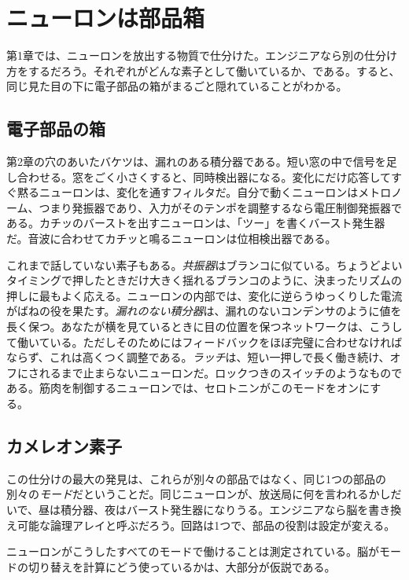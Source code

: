 \chapter{ニューロンは部品箱}

第1章では、ニューロンを放出する物質で仕分けた。エンジニアなら別の仕分け方をするだろう。それぞれがどんな素子として働いているか、である。すると、同じ見た目の下に電子部品の箱がまるごと隠れていることがわかる。

\section*{電子部品の箱}

第2章の穴のあいたバケツは、漏れのある積分器である。短い窓の中で信号を足し合わせる。窓をごく小さくすると、同時検出器になる。変化にだけ応答してすぐ黙るニューロンは、変化を通すフィルタだ。自分で動くニューロンはメトロノーム、つまり発振器であり、入力がそのテンポを調整するなら電圧制御発振器である。カチッのバーストを出すニューロンは、「ツー」を書くバースト発生器だ。音波に合わせてカチッと鳴るニューロンは位相検出器である。


これまで話していない素子もある。\emph{共振器}はブランコに似ている。ちょうどよいタイミングで押したときだけ大きく揺れるブランコのように、決まったリズムの押しに最もよく応える。ニューロンの内部では、変化に逆らうゆっくりした電流がばねの役を果たす。\emph{漏れのない積分器}は、漏れのないコンデンサのように値を長く保つ。あなたが横を見ているときに目の位置を保つネットワークは、こうして働いている。ただしそのためにはフィードバックをほぼ完璧に合わせなければならず、これは高くつく調整である。\emph{ラッチ}は、短い一押しで長く働き続け、オフにされるまで止まらないニューロンだ。ロックつきのスイッチのようなものである。筋肉を制御するニューロンでは、セロトニンがこのモードをオンにする。

\section*{カメレオン素子}

この仕分けの最大の発見は、これらが別々の部品ではなく、同じ1つの部品の別々の\emph{モード}だということだ。同じニューロンが、放送局に何を言われるかしだいで、昼は積分器、夜はバースト発生器になりうる。エンジニアなら脳を書き換え可能な論理アレイと呼ぶだろう。回路は1つで、部品の役割は設定が変える。

ニューロンがこうしたすべてのモードで働けることは測定されている。脳がモードの切り替えを計算にどう使っているかは、大部分が仮説である。

